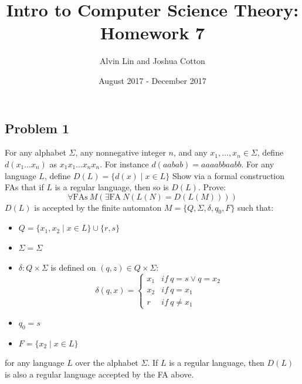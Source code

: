 \documentclass{math}
\title{Intro to Computer Science Theory: Homework 7}
\author{Alvin Lin and Joshua Cotton}
\date{August 2017 - December 2017}
\begin{document}
\maketitle

\subsection*{Problem 1}
For any alphabet \( \Sigma \), any nonnegative integer \( n \), and any
\( x_1,\dots,x_n\in\Sigma \), define \( d(x_1\dots x_n) \) as
\( x_1x_1\dots x_nx_n \). For instance \( d(aabab) = aaaabbaabb \). For
any language \( L \), define \( D(L) = \{d(x)\mid x\in L\} \) Show via
a formal construction FAs that if \( L \) is a regular language, then so
is \( D(L) \). Prove:
\[ \forall\text{FAs}~M(\exists\text{FA}~N(L(N) = D(L(M)))) \]
\( D(L) \) is accepted by the finite automaton \( M = \{Q,\Sigma,\delta,q_0,F\}
\) such that:
\begin{itemize}
  \item \( Q = \{x_1,x_2\mid x\in L\}\cup\{r,s\} \)
  \item \( \Sigma = \Sigma \)
  \item \( \delta:Q\times\Sigma \) is defined on \( (q,z)\in Q\times\Sigma \):
  \[ \delta(q,x) = \begin{cases}
    x_1 & if~q = s\vee q = x_2 \\
    x_2 & if~q = x_1 \\
    r & if~q \ne x_1
  \end{cases} \]
  \item \( q_0 = s \)
  \item \( F = \{x_2\mid x\in L\} \)
\end{itemize}
for any language \( L \) over the alphabet \( \Sigma \). If \( L \) is a regular
language, then \( D(L) \) is also a regular language accepted by the FA above.
\end{document}
